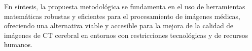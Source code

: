 \vspace{0.5cm}

En síntesis, la propuesta metodológica se fundamenta en el uso de herramientas matemáticas robustas y eficientes para el procesamiento de imágenes médicas, ofreciendo una alternativa viable y accesible para la mejora de la calidad de imágenes de CT cerebral en entornos con restricciones tecnológicas y de recursos humanos.
